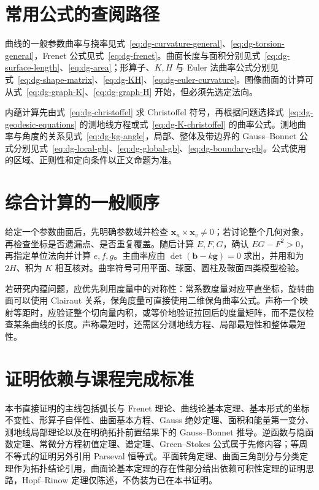 \documentclass[UTF8,12pt,a4paper,fontset=fandol]{ctexbook}
\begin{document}
\section{常用公式的查阅路径}
曲线的一般参数曲率与挠率见式~\eqref{eq:dg-curvature-general}、\eqref{eq:dg-torsion-general}，Frenet 公式见式~\eqref{eq:dg-frenet}。曲面长度与面积分别见式~\eqref{eq:dg-surface-length}、\eqref{eq:dg-area}；形算子、$K,H$ 与 Euler 法曲率公式分别见式~\eqref{eq:dg-shape-matrix}、\eqref{eq:dg-KH}、\eqref{eq:dg-euler-curvature}。图像曲面的计算可从式~\eqref{eq:dg-graph-K}、\eqref{eq:dg-graph-H} 开始，但必须先选定法向。

内蕴计算先由式~\eqref{eq:dg-christoffel} 求 Christoffel 符号，再根据问题选择式~\eqref{eq:dg-geodesic-equations} 的测地线方程或式~\eqref{eq:dg-K-christoffel} 的曲率公式。测地曲率与角度的关系见式~\eqref{eq:dg-kg-angle}，局部、整体及带边界的 Gauss--Bonnet 公式分别见式~\eqref{eq:dg-local-gb}、\eqref{eq:dg-global-gb}、\eqref{eq:dg-boundary-gb}。公式使用的区域、正则性和定向条件以正文命题为准。

\section{综合计算的一般顺序}
给定一个参数曲面后，先明确参数域并检查 $\mathbf x_u\times\mathbf x_v\ne0$；若讨论整个几何对象，再检查坐标是否遗漏点、是否重复覆盖。随后计算 $E,F,G$，确认 $EG-F^2>0$，再指定单位法向并计算 $e,f,g$。主曲率应由 $\det(\mathbf b-k\mathbf g)=0$ 求出，并用和为 $2H$、积为 $K$ 相互核对。曲率符号可用平面、球面、圆柱及鞍面四类模型检验。

若研究内蕴问题，应优先利用度量中的对称性：常系数度量对应平直坐标，旋转曲面可以使用 Clairaut 关系，保角度量可直接使用二维保角曲率公式。声称一个映射等距时，应验证整个切向量内积，或等价地验证拉回后的度量矩阵，而不是仅检查某条曲线的长度。声称最短时，还需区分测地线方程、局部最短性和整体最短性。

\section{证明依赖与课程完成标准}
本书直接证明的主线包括弧长与 Frenet 理论、曲线论基本定理、基本形式的坐标不变性、形算子自伴性、曲面基本方程、Gauss 绝妙定理、面积和能量第一变分、测地线局部理论以及在明确拓扑前置结果下的 Gauss--Bonnet 推导。逆函数与隐函数定理、常微分方程初值定理、谱定理、Green--Stokes 公式属于先修内容；等周不等式的证明另外引用 Parseval 恒等式。平面转角定理、曲面三角剖分与分类定理作为拓扑结论引用，曲面论基本定理的存在性部分给出依赖可积性定理的证明思路，Hopf--Rinow 定理仅陈述，不伪装为已在本书证明。
\end{document}
